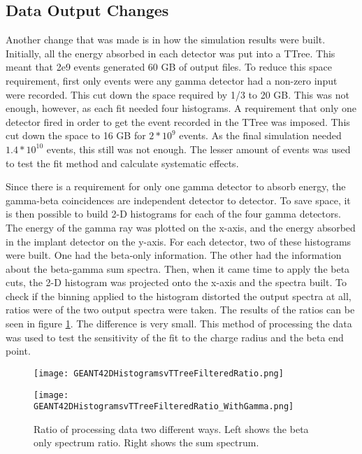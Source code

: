 \documentclass[../MaxHughesThesis.tex]{subfiles}
\begin{document}
\subsection{Data Output Changes}
Another change that was made is in how the simulation results were built.
Initially, all the energy absorbed in each detector was put into a TTree.
This meant that 2e9 events generated 60 GB of output files.
To reduce this space requirement, first only events were any gamma detector had a non-zero input were recorded.
This cut down the space required by 1/3 to 20 GB.
This was not enough, however, as each fit needed four histograms.
A requirement that only one detector fired in order to get the event recorded in the TTree was imposed. 
This cut down the space to 16 GB for $2 * 10^{9}$ events.
As the final simulation needed $1.4 * 10^{10}$ events, this still was not enough.
The lesser amount of events was used to test the fit method and calculate systematic effects.

Since there is a requirement for only one gamma detector to absorb energy, the gamma-beta coincidences are independent detector to detector.
To save space, it is then possible to build 2-D histograms for each of the four gamma detectors.
The energy of the gamma ray was plotted on the x-axis, and the energy absorbed in the implant detector on the y-axis. 
For each detector, two of these histograms were built.
One had the beta-only information.
The other had the information about the beta-gamma sum spectra.
Then, when it came time to apply the beta cuts, the 2-D histogram was projected onto the x-axis and the spectra built.
To check if the binning applied to the histogram distorted the output spectra at all, ratios were of the two output spectra were taken.
The results of the ratios can be seen in figure \ref{fig:histogramtottreeratio}.
The difference is very small.
This method of processing the data was used to test the sensitivity of the fit to the charge radius and the beta end point.

\begin{figure}
    \centering
    \begin{minipage}{0.50\textwidth}
        \centerline{\texttt{[image: GEANT42DHistogramsvTTreeFilteredRatio.png]}}
    \end{minipage}\hfill
    \begin{minipage}{0.50\textwidth}
        \centerline{\texttt{[image: GEANT42DHistogramsvTTreeFilteredRatio\_WithGamma.png]}}
    \end{minipage}
    \caption{Ratio of processing data two different ways.
	     Left shows the beta only spectrum ratio.
	     Right shows the sum spectrum.}
    \label{fig:histogramtottreeratio}
\end{figure}
\end{document}
